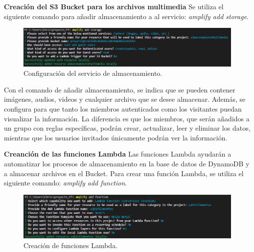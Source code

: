  \noindent \textbf{\large Creación del S3 Bucket para los archivos multimedia} \newline
Se utiliza el siguiente comando para añadir almacenamiento a al servicio: \textit{amplify add storage}.
\begin{figure}[H]
	\centering
	\includegraphics[width=1\linewidth]{imagenes/addStorage}
	\caption{Configuración del servicio de almacenamiento.}
	\label{fig:addstorage}
\end{figure}
\noindent Con el comando de añadir almacenamiento, se indica que se pueden contener imágenes, audios, videos y cualquier archivo que se desee almacenar. Además, se configura para que tanto los miembros autenticados como los visitantes puedan visualizar la información. La diferencia es que los miembros, que serán añadidos a un grupo con reglas específicas, podrán crear, actualizar, leer y eliminar los datos, mientras que los usuarios invitados únicamente podrán ver la información.

\noindent \textbf{\large Creanción de las funciones Lambda 
} \newline
Las funciones Lambda ayudarán a automatizar los procesos de almacenamiento en la base de datos de DynamoDB y a almacenar archivos en el Bucket. Para crear una función Lambda, se utiliza el siguiente comando: \textit{amplify add function}.
\begin{figure}[H]
	\centering
	\includegraphics[width=1\linewidth]{imagenes/add_function}
	\caption{Creación de funciones Lambda.}
	\label{fig:addfunction}
\end{figure}


